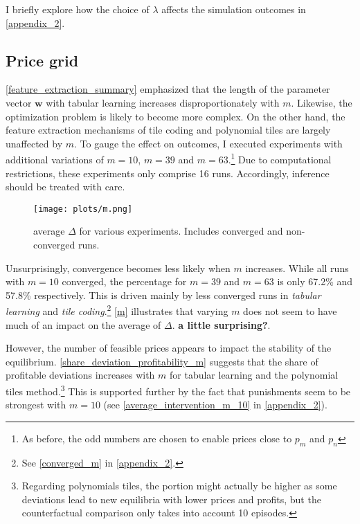 I briefly explore how the choice of $\lambda$ affects the simulation outcomes in \autoref{appendix_2}.

\subsection{Price grid}

\autoref{feature_extraction_summary} emphasized that the length of the parameter vector $\boldsymbol{w}$ with tabular learning increases disproportionately with $m$. Likewise, the optimization problem is likely to become more complex. On the other hand, the feature extraction mechanisms of tile coding and polynomial tiles are largely unaffected by $m$. To gauge the effect on outcomes, I executed experiments with additional variations of $m=10$, $m = 39$ and $m = 63$.\footnote{As before, the odd numbers are chosen to enable prices close to $p_m$ and $p_n$} Due to computational restrictions, these experiments  only comprise 16 runs. Accordingly, inference should be treated with care.

\begin{figure}
	\texttt{[image: plots/m.png]}
	\caption{average $\Delta$ for various experiments. Includes converged and non-converged runs.}
	\label{m}
\end{figure}

Unsurprisingly, convergence becomes less likely when $m$ increases. While all runs with $m=10$ converged, the percentage for $m=39$ and $m=63$ is only  67.2\% and 57.8\% respectively. This is driven mainly by less converged runs in \emph{tabular learning} and \emph{tile coding}.\footnote{See \autoref{converged_m} in \autoref{appendix_2}.} \autoref{m} illustrates that varying $m$ does not seem to have much of an impact on the average of $\Delta$. 
\textbf{a little surprising?}. 

However, the number of feasible prices appears to impact the stability of the equilibrium. \autoref{share_deviation_profitability_m} suggests that the share of profitable deviations increases with $m$ for tabular learning and the polynomial tiles method.\footnote{Regarding polynomials tiles, the portion might actually be higher as some deviations lead to new equilibria with lower prices and profits, but the counterfactual comparison only takes into account 10 episodes.} This is supported further by the fact that punishments seem to be strongest with $m = 10$ (see \autoref{average_intervention_m_10} in \autoref{appendix_2}).

